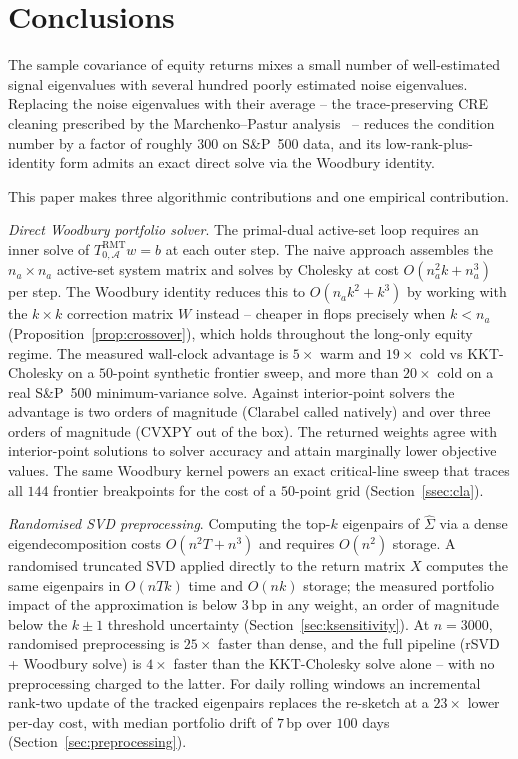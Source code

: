 \section{Conclusions}\label{sec:conclusions}

The sample covariance of equity returns mixes a small number of well-estimated
signal eigenvalues with several hundred poorly estimated noise eigenvalues.
Replacing the noise eigenvalues with their average -- the trace-preserving CRE
cleaning prescribed by the Marchenko--Pastur
analysis~\cite{laloux1999,bun2017} -- reduces the condition number by a factor
of roughly $300$ on S\&P~500 data, and its low-rank-plus-identity form admits
an exact direct solve via the Woodbury identity.

This paper makes three algorithmic contributions and one empirical contribution.

\emph{Direct Woodbury portfolio solver}. The primal-dual active-set loop requires
an inner solve of $T_{0,\mathcal{A}}^{\mathrm{RMT}} w = b$ at each outer step.
The naive approach assembles the $n_a \times n_a$ active-set system matrix and
solves by Cholesky at cost $O(n_a^2 k + n_a^3)$ per step. The Woodbury
identity reduces this to $O(n_a k^2 + k^3)$ by working with the $k \times k$
correction matrix $W$ instead -- cheaper in flops precisely when $k < n_a$
(Proposition~\ref{prop:crossover}), which holds throughout the long-only
equity regime. The measured wall-clock advantage is $5\times$ warm and
$19\times$ cold vs KKT-Cholesky on a $50$-point synthetic frontier sweep, and
more than $20\times$ cold on a real S\&P~500 minimum-variance solve. Against
interior-point solvers the advantage is two orders of magnitude (Clarabel
called natively) and over three orders of magnitude (CVXPY out of the box).
The returned weights agree with interior-point solutions to solver accuracy
and attain marginally lower objective values. The same Woodbury kernel powers
an exact critical-line sweep that traces all $144$ frontier breakpoints for
the cost of a $50$-point grid (Section~\ref{ssec:cla}).

\emph{Randomised SVD preprocessing}. Computing the top-$k$ eigenpairs of
$\hat\Sigma$ via a dense eigendecomposition costs $O(n^2 T + n^3)$ and requires
$O(n^2)$ storage. A randomised truncated SVD applied directly to the return
matrix $X$ computes the same eigenpairs in $O(nTk)$ time and $O(nk)$ storage;
the measured portfolio impact of the approximation is below $3$\,bp in any
weight, an order of magnitude below the $k \pm 1$ threshold uncertainty
(Section~\ref{sec:ksensitivity}). At $n=3000$, randomised preprocessing is
$25\times$ faster than dense, and the full pipeline (rSVD + Woodbury solve)
is $4\times$ faster than the KKT-Cholesky solve alone -- with no
preprocessing charged to the latter. For daily rolling windows an incremental
rank-two update of the tracked eigenpairs replaces the re-sketch at a
$23\times$ lower per-day cost, with median portfolio drift of $7$\,bp over
$100$ days (Section~\ref{sec:preprocessing}).

